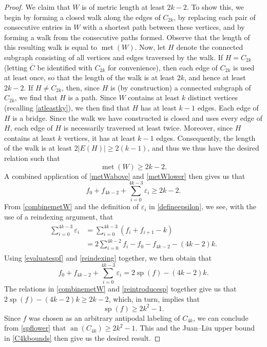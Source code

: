 \documentclass[12pt]{article}
\begin{document}
\begin{proof}
 We claim that $W$ is of metric length at least $2k-2$. To show this, we begin by forming a closed walk along the edges of $C_{2k}$, by 
 replacing each pair of consecutive entries in $W$ with a shortest path between these vertices, and by forming a walk from the 
 consecutive paths formed. Observe that the length of this resulting walk is equal to $\operatorname{met}(W)$. Now, let $H$ denote 
 the connected subgraph consisting of all vertices and edges traversed by the walk. If $H = C_{2k}$ (letting $\overline{C}$ be identified 
 with $C_{2k}$ for convenience), then each edge of $C_{2k}$ is used at least once, so that the length of the walk is at least $2k$, and 
 hence at least $2k-2$. If $H \neq C_{2k}$, then, since $H$ is (by construction) a connected subgraph of $C_{2k}$, we find that $H$ is a 
 path. Since $W$ contains at least $k$ distinct vertices (recalling \eqref{atleastky}), we then find that $H$ has at least $k - 1$ edges. 
 Each edge of $H$ is a bridge. Since the walk we have constructed is closed and uses every edge of $H$, each edge of $H$ is necessarily
 traversed at least twice. Moreover, since $H$ contains at least $k$ vertices, it has at least $k-1$ edges. Consequently, the length of the 
 walk is at least $2 | E(H) | \geq 2(k-1)$, and thus we thus have the desired relation such that
\begin{equation}\label{metWlower}
 \operatorname{met}(W) \geq 2 k - 2. 
\end{equation} 
 A combined application of \eqref{metWabove} and \eqref{metWlower} then gives us that 
\begin{equation}\label{combinemetW} 
 f_{0} + f_{4k-2} + \sum_{i=0}^{4k-3} \varepsilon_{i} \geq 2 k - 2. 
\end{equation}
 From \eqref{combinemetW} and the definition of $\varepsilon_{i}$ in \eqref{defineepsilon}, we see, 
 with the use of a reindexing argument, that 
\begin{align}
\begin{split}
 \sum_{i=0}^{4k-3} \varepsilon_{i} 
 & = \sum_{i=0}^{4k-3} (f_{i} + f_{i+1} - k) \\ 
 & = 2 \sum_{i=0}^{4k-2} f_{i} - f_{0} - f_{4k-2} - (4k-2) k.
\end{split}\label{reindexing}
\end{align}
 Using \eqref{evaluatespf} and \eqref{reindexing} together, we then obtain that 
\begin{equation}\label{reintroducesp} 
 f_{0} + f_{4k-2} + \sum_{i=0}^{4k-3} \varepsilon_{i} = 2 \operatorname{sp}(f) - (4k-2) k. 
\end{equation}
 The relations in \eqref{combinemetW} and \eqref{reintroducesp} together give us that $ 2 \operatorname{sp}(f) - (4 k - 2) k \geq 2 k - 
 2$, which, in turn, implies that 
\begin{equation}\label{spflower} 
 \operatorname{sp}(f) \geq 2 k^2 - 1. 
\end{equation}
 Since $f$ was chosen as an arbitrary antipodal labeling of $C_{4k}$, we can conclude from \eqref{spflower} that 
 $\operatorname{an}(C_{4k}) \geq 2k^2 - 1$. This and the Juan--Liu upper bound in \eqref{C4kbounds} 
 \cite[Theorem 9]{JuanLiu2012}
 then give us the desired result. 
\end{proof}
\end{document}
